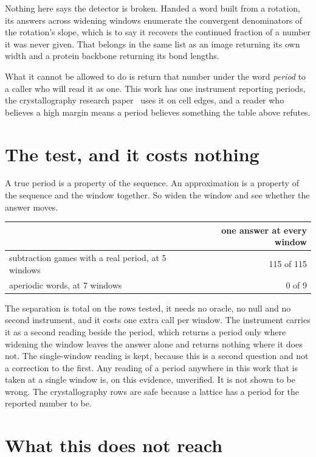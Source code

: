 Nothing here says the detector is broken. Handed a word built from a rotation, its answers across
widening windows enumerate the convergent denominators of the rotation's slope, which is to say it
recovers the continued fraction of a number it was never given. That belongs in the same list as an
image returning its own width and a protein backbone returning its bond lengths.

What it cannot be allowed to do is return that number under the word \emph{period} to a caller who
will read it as one. This work has one instrument reporting periods, the crystallography research paper~\cite{src:Quigg-crystallography}
uses it on cell edges, and a reader who believes a high margin means a period believes something the
table above refutes.

\section{The test, and it costs nothing}

A true period is a property of the sequence. An approximation is a property of the sequence and the
window together. So widen the window and see whether the answer moves.

\begin{center}
\begin{tabular}{@{}lr@{}}
\toprule
& one answer at every window \\
\midrule
subtraction games with a real period, at 5 windows & 115 of 115 \\
aperiodic words, at 7 windows & 0 of 9 \\
\bottomrule
\end{tabular}
\end{center}

The separation is total on the rows tested, it needs no oracle, no null and no second instrument,
and it costs one extra call per window. The instrument carries it as a second reading beside the period, which returns a period only where
widening the window leaves the answer alone and returns nothing where it does not. The
single-window reading is kept, because this is a second question and not a correction to the first.
Any reading of a period anywhere in this work that is taken at a single window is, on this evidence, unverified. It is not shown to be wrong. The crystallography
rows are safe because a lattice has a period for the reported number to be.

\section{What this does not reach}

